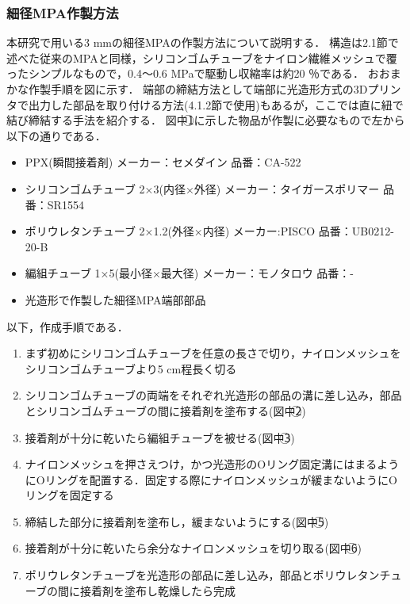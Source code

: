 \subsubsection{細径MPA作製方法}
本研究で用いる3 mmの細径MPAの作製方法について説明する．
構造は2.1節で述べた従来のMPAと同様，シリコンゴムチューブをナイロン繊維メッシュで覆ったシンプルなもので，0.4～0.6 MPaで駆動し収縮率は約20 ％である．
おおまかな作製手順を図に示す．
端部の締結方法として端部に光造形方式の3Dプリンタで出力した部品を取り付ける方法(4.1.2節で使用)もあるが，ここでは直に紐で結び締結する手法を紹介する．
図中\textcircled{\scriptsize 1}に示した物品が作製に必要なもので左から以下の通りである．
%
\begin{itemize}
  \item PPX(瞬間接着剤) メーカー：セメダイン 品番：CA-522
  \item シリコンゴムチューブ 2×3(内径×外径) メーカー：タイガースポリマー 品番：SR1554
  \item ポリウレタンチューブ 2×1.2(外径×内径) メーカー:PISCO 品番：UB0212-20-B
  \item 編組チューブ 1×5(最小径×最大径) メーカー：モノタロウ 品番：-
  \item 光造形で作製した細径MPA端部部品
\end{itemize}
%
以下，作成手順である．
%
\begin{enumerate}
  \item まず初めにシリコンゴムチューブを任意の長さで切り，ナイロンメッシュをシリコンゴムチューブより5 cm程長く切る
  \item シリコンゴムチューブの両端をそれぞれ光造形の部品の溝に差し込み，部品とシリコンゴムチューブの間に接着剤を塗布する(図中\textcircled{\scriptsize 2})
  \item 接着剤が十分に乾いたら編組チューブを被せる(図中\textcircled{\scriptsize 3})
  \item ナイロンメッシュを押さえつけ，かつ光造形のOリング固定溝にはまるようにOリングを配置する．固定する際にナイロンメッシュが緩まないようにOリングを固定する
  \item 締結した部分に接着剤を塗布し，緩まないようにする(図中\textcircled{\scriptsize 5})
  \item 接着剤が十分に乾いたら余分なナイロンメッシュを切り取る(図中\textcircled{\scriptsize 6})
  \item ポリウレタンチューブを光造形の部品に差し込み，部品とポリウレタンチューブの間に接着剤を塗布し乾燥したら完成
\end{enumerate}
%
